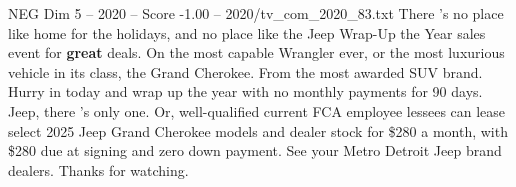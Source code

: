 \begin{textsample}{NEG Dim 5 – 2020 – Score -1.00 – 2020/tv\_com\_2020\_83.txt}  \label{ex:f5_neg_070}
There 's no place like home for the holidays, and no place like the Jeep Wrap-Up the Year sales event for \textbf{great} deals.
On the most capable Wrangler ever, or the most luxurious vehicle in its class, the Grand Cherokee.
From the most awarded SUV brand.
Hurry in today and wrap up the year with no monthly payments for 90 days.
Jeep, there 's only one.
Or, well-qualified current FCA employee lessees can lease select 2025 Jeep Grand Cherokee models and dealer stock for \$280 a month, with \$280 due at signing and zero down payment.
See your Metro Detroit Jeep brand dealers.
Thanks for watching.

\end{textsample}
